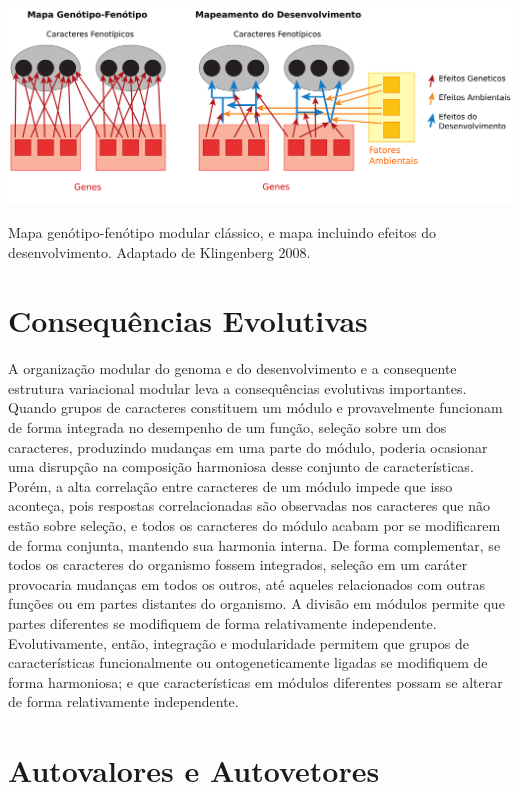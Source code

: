 \documentclass[portuges,]{tufte-handout}
\begin{document}
\begin{marginfigure}
\includegraphics{./figuras/mapgenfen.png}
\caption{Mapa genótipo-fenótipo modular clássico, e mapa incluindo
efeitos do desenvolvimento. Adaptado de Klingenberg 2008.}
\label{mapagenfen}
\end{marginfigure}

\section{Consequências Evolutivas}\label{consequuxeancias-evolutivas}

A organização modular do genoma e do desenvolvimento e a consequente
estrutura variacional modular leva a consequências evolutivas
importantes. Quando grupos de caracteres constituem um módulo e
provavelmente funcionam de forma integrada no desempenho de um função,
seleção sobre um dos caracteres, produzindo mudanças em uma parte do
módulo, poderia ocasionar uma disrupção na composição harmoniosa desse
conjunto de características. Porém, a alta correlação entre caracteres
de um módulo impede que isso aconteça, pois respostas correlacionadas
são observadas nos caracteres que não estão sobre seleção, e todos os
caracteres do módulo acabam por se modificarem de forma conjunta,
mantendo sua harmonia interna. De forma complementar, se todos os
caracteres do organismo fossem integrados, seleção em um caráter
provocaria mudanças em todos os outros, até aqueles relacionados com
outras funções ou em partes distantes do organismo. A divisão em módulos
permite que partes diferentes se modifiquem de forma relativamente
independente. Evolutivamente, então, integração e modularidade permitem
que grupos de características funcionalmente ou ontogeneticamente
ligadas se modifiquem de forma harmoniosa; e que características em
módulos diferentes possam se alterar de forma relativamente
independente.

\section{Autovalores e Autovetores}\label{autovalores-e-autovetores}
\end{document}
